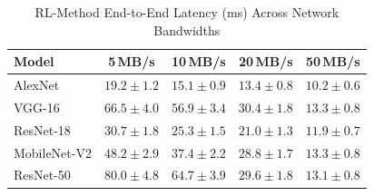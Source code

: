 \begin{table}[htbp]
\centering
\caption{RL-Method End-to-End Latency (ms) Across Network Bandwidths}
\label{tab:rl_bandwidth}
\begin{tabular}{lcccc}
\toprule
\textbf{Model} & \textbf{5\,MB/s} & \textbf{10\,MB/s} & \textbf{20\,MB/s} & \textbf{50\,MB/s} \\
\midrule
AlexNet & $19.2\pm1.2$ & $15.1\pm0.9$ & $13.4\pm0.8$ & $10.2\pm0.6$ \\
VGG-16 & $66.5\pm4.0$ & $56.9\pm3.4$ & $30.4\pm1.8$ & $13.3\pm0.8$ \\
ResNet-18 & $30.7\pm1.8$ & $25.3\pm1.5$ & $21.0\pm1.3$ & $11.9\pm0.7$ \\
MobileNet-V2 & $48.2\pm2.9$ & $37.4\pm2.2$ & $28.8\pm1.7$ & $13.3\pm0.8$ \\
ResNet-50 & $80.0\pm4.8$ & $64.7\pm3.9$ & $29.6\pm1.8$ & $13.1\pm0.8$ \\
\bottomrule
\end{tabular}
\end{table}